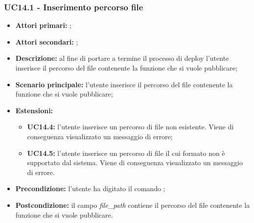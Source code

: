 \subsubsection{UC14.1 - Inserimento percorso file}
\begin{itemize}
	\item \textbf{Attori primari:} \us{};
	\item \textbf{Attori secondari:} \re{};
	\item \textbf{Descrizione:} al fine di portare a termine il processo di deploy l’utente inserisce il percorso del file contenente la funzione che si vuole pubblicare;  
	\item \textbf{Scenario principale:} l'utente inserisce il percorso del file contenente la funzione che si vuole pubblicare; 
	\item \textbf{Estensioni:} 
	\begin{itemize}
		\item \textbf{UC14.4:} l’utente inserisce un percorso di file non esistente. Viene di conseguenza visualizzato un messaggio di errore;
		\item \textbf{UC14.5:} l’utente inserisce un percorso di file il cui formato non è supportato dal sistema. Viene di conseguenza visualizzato un messaggio di errore. 
	\end{itemize}
	\item \textbf{Precondizione:} l’utente ha digitato il comando \deploy{}; 
	\item \textbf{Postcondizione:} il campo \textit{file\_path} contiene il percorso del file contenente la funzione che si vuole pubblicare. 
\end{itemize}